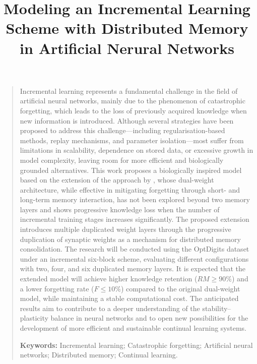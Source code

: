 \documentclass[10pt,a4paper]{article}
\title{Modeling an Incremental Learning Scheme with Distributed Memory in Artificial Nerural Networks}
\renewenvironment{abstract}{
  \begin{center}
    \bfseries \abstractname 
  \end{center}
  \begin{quote}
  \justifying
}{
  \end{quote}
}
\begin{document}
    

    \tableofcontents
    \listoffigures
    \listoftables

    \maketitle

\begin{abstract}
\justifying
Incremental learning represents a fundamental challenge in the field of artificial neural networks,
mainly due to the phenomenon of catastrophic forgetting, which leads to the loss of previously
acquired knowledge when new information is introduced.
Although several strategies have been proposed to address this challenge---including
regularisation-based methods, replay mechanisms, and parameter isolation---most suffer from
limitations in scalability, dependence on stored data, or excessive growth in model complexity,
leaving room for more efficient and biologically grounded alternatives.
This work proposes a biologically inspired model based on the extension of the approach by
\cite{bullinaria2009}, whose dual-weight architecture, while effective in mitigating forgetting
through short- and long-term memory interaction, has not been explored beyond two memory layers
and shows progressive knowledge loss when the number of incremental training stages increases
significantly.
The proposed extension introduces multiple duplicated weight layers through the progressive
duplication of synaptic weights as a mechanism for distributed memory consolidation.
The research will be conducted using the OptDigits dataset under an incremental six-block scheme,
evaluating different configurations with two, four, and six duplicated memory layers.
It is expected that the extended model will achieve higher knowledge retention (\(RM \geq 90\%\))
and a lower forgetting rate (\(F \leq 10\%\)) compared to the original dual-weight model, while
maintaining a stable computational cost.
The anticipated results aim to contribute to a deeper understanding of the stability--plasticity
balance in neural networks and to open new possibilities for the development of more efficient
and sustainable continual learning systems.

\vspace{1em}
\noindent\textbf{Keywords:} Incremental learning; Catastrophic forgetting; Artificial neural
networks; Distributed memory; Continual learning.
\end{abstract}
\end{document}
